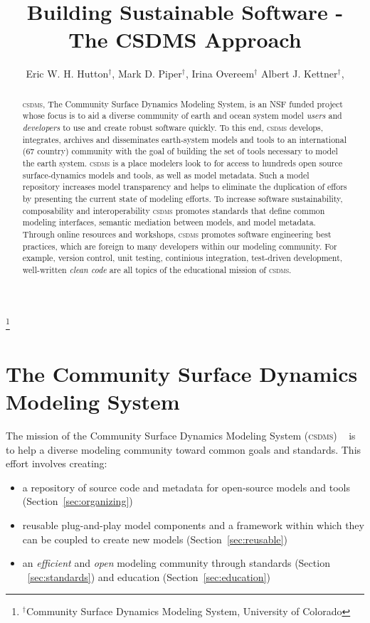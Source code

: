 \documentclass[11pt, oneside]{amsart}
\DeclareRobustCommand{\csdms}{\textsc{csdms}}
\begin{document}
\title[]{Building Sustainable Software - The CSDMS Approach}

\author{
  Eric W. H. Hutton$^{\dag}$,
  Mark D. Piper$^{\dag}$,
  Irina Overeem$^{\dag}$
  Albert J. Kettner$^{\dag}$,
}

\thanks{{}$^{\dag}$Community Surface Dynamics Modeling System, University of
Colorado}

\begin{abstract}

\csdms, The Community Surface Dynamics Modeling System, is an NSF funded
project whose focus is to aid a diverse community of earth and ocean system
model \emph{users} and \emph{developers} to use and create robust software
quickly.  To this end, \csdms{} develops, integrates, archives and disseminates
earth-system models and tools to an international (67 country) community
with the goal of building the set of tools necessary to model the
earth system. \csdms{} is a place modelers look to for access to hundreds open
source surface-dynamics models and tools, as well as model metadata. Such a
model repository increases model transparency and helps to eliminate the
duplication of effors by presenting the current state of modeling efforts.
To increase software sustainability, composability and interoperability \csdms{}
promotes standards that define common modeling interfaces, semantic mediation
between models, and model metadata. Through online resources and workshops,
\csdms{} promotes software engineering best practices, which are foreign to many
developers within our modeling community. For example, version control, unit
testing, continious integration, test-driven development, well-written
\emph{clean code} are all topics of the educational mission of \csdms{}.

\end{abstract}

\maketitle

\section{The Community Surface Dynamics Modeling System}

The mission of the Community Surface Dynamics Modeling System (\csdms{})
~\cite{peckham2012component} is to help a diverse modeling community toward
common goals and standards. This effort involves creating:
\begin{itemize}
  \item a repository of source code and metadata for open-source models and
    tools (Section~\ref{sec:organizing})
  \item reusable plug-and-play model components and a framework
        within which they can be coupled to create new models
        (Section~\ref{sec:reusable})
  \item an \emph{efficient} and \emph{open} modeling community through
        standards (Section ~\ref{sec:standards}) and education
        (Section~\ref{sec:education})
\end{itemize}
\end{document}
